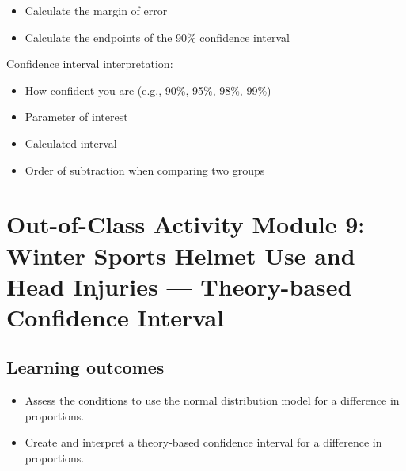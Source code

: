\documentclass[
]{report}
\providecommand{\tightlist}{%
  \setlength{\itemsep}{0pt}\setlength{\parskip}{0pt}}
\begin{document}
\vspace{0.8in}

\begin{itemize}
\tightlist
\item
  Calculate the margin of error
\end{itemize}

\vspace{0.6in}

\begin{itemize}
\tightlist
\item
  Calculate the endpoints of the 90\% confidence interval
\end{itemize}

\vspace{0.6in}

Confidence interval interpretation:

\begin{itemize}
\item
  How confident you are (e.g., 90\%, 95\%, 98\%, 99\%)
\item
  Parameter of interest
\item
  Calculated interval
\item
  Order of subtraction when comparing two groups
\end{itemize}

\vspace{0.8in}

\newpage

\hypertarget{out-of-class-activity-module-9-winter-sports-helmet-use-and-head-injuries-theory-based-confidence-interval}{%
\section{Out-of-Class Activity Module 9: Winter Sports Helmet Use and Head Injuries --- Theory-based Confidence Interval}\label{out-of-class-activity-module-9-winter-sports-helmet-use-and-head-injuries-theory-based-confidence-interval}}


\hypertarget{learning-outcomes-17}{%
\subsection{Learning outcomes}\label{learning-outcomes-17}}

\begin{itemize}
\item
  Assess the conditions to use the normal distribution model for a difference in proportions.
\item
  Create and interpret a theory-based confidence interval for a difference in proportions.
\end{itemize}
\end{document}
